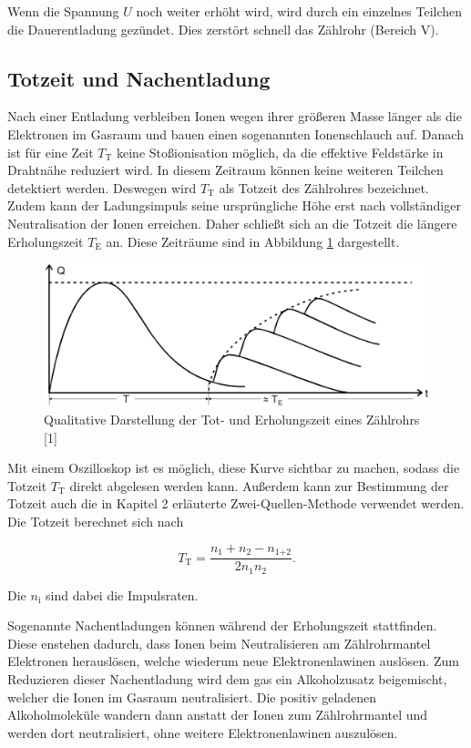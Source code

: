 Wenn die Spannung $U$ noch weiter erhöht wird, wird durch ein einzelnes Teilchen 
die Dauerentladung gezündet. Dies zerstört schnell das Zählrohr (Bereich V). 

\subsection{Totzeit und Nachentladung}

Nach einer Entladung verbleiben Ionen wegen ihrer größeren Masse länger als 
die Elektronen im Gasraum und bauen einen sogenannten Ionenschlauch auf. 
Danach ist für eine Zeit $T_\text{T}$ keine Stoßionisation möglich, da die 
effektive Feldstärke in Drahtnähe reduziert wird. In diesem Zeitraum können 
keine weiteren Teilchen detektiert werden. Deswegen wird $T_\text{T}$ als 
Totzeit des Zählrohres bezeichnet. Zudem kann der Ladungsimpuls seine 
ursprüngliche Höhe erst nach vollständiger Neutralisation der Ionen erreichen. 
Daher schließt sich an die Totzeit die längere Erholungszeit $T_\text{E}$ 
an. Diese Zeiträume sind in Abbildung \ref{fig:Totzeit} dargestellt. 

\begin{figure}
  \centering
  \includegraphics[scale=0.3]{content/Totzeit.png}
  \caption{Qualitative Darstellung der Tot- und Erholungszeit eines Zählrohrs [1]}
  \label{fig:Totzeit}
\end{figure}

Mit einem Oszilloskop ist es möglich, diese Kurve sichtbar zu machen, sodass die
Totzeit $T_\text{T}$ direkt abgelesen werden kann. Außerdem kann zur Bestimmung 
der Totzeit auch die in Kapitel 2 erläuterte Zwei-Quellen-Methode verwendet werden. 
Die Totzeit berechnet sich nach 

\begin{equation}
T_\text{T} = \frac{n_1+n_2-n_\text{1+2}}{2n_1n_2}.
\end{equation}

Die $n_\text{i}$ sind dabei die Impulsraten.

Sogenannte Nachentladungen können während der Erholungszeit stattfinden. Diese 
enstehen dadurch, dass Ionen beim Neutralisieren am Zählrohrmantel Elektronen 
herauslösen, welche wiederum neue Elektronenlawinen auslösen. Zum Reduzieren 
dieser Nachentladung wird dem gas ein Alkoholzusatz beigemischt, welcher die 
Ionen im Gasraum neutralisiert. Die positiv geladenen Alkoholmoleküle wandern
dann anstatt der Ionen zum Zählrohrmantel und werden dort neutralisiert, ohne 
weitere Elektronenlawinen auszulösen. 